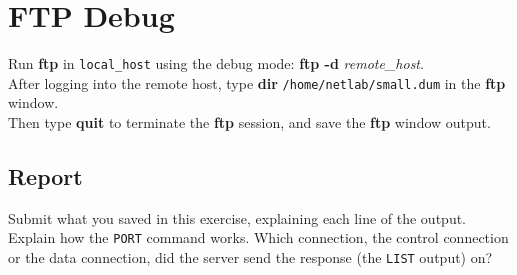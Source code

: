 \documentclass[10pt,a4paper]{article}
\numberwithin{equation}{section}
\numberwithin{figure}{section}
\numberwithin{table}{section}
\begin{document}
\section{FTP Debug}
	Run \textbf{ftp} in \texttt{local\_host} using the debug mode: \textbf{ftp -d} \textit{remote\_host}. \\
	After logging into the remote host, type \textbf{dir} \texttt{/home/netlab/small.dum} in the \textbf{ftp} window. \\
	Then type \textbf{quit} to terminate the \textbf{ftp} session, and save the \textbf{ftp} window output.
	\subsection*{Report}
	Submit what you saved in this exercise, explaining each line of the output.
	Explain how the \texttt{PORT} command works.
	Which connection, the control connection or the data connection, did the server send the response (the \texttt{LIST} output) on?
\end{document}
